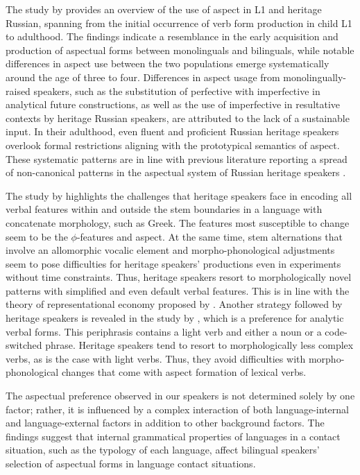\documentclass[output=paper,colorlinks,citecolor=brown]{langscibook}
\begin{document}
The study by \textcite{gagarina2020first} provides an overview of the use of aspect in L1 and heritage Russian, spanning from the initial occurrence of verb form production in child L1 to adulthood. The findings indicate a resemblance in the early acquisition and production of aspectual forms between monolinguals and bilinguals, while notable differences in aspect use between the two populations emerge systematically around the age of three to four. 
Differences in aspect usage from monolingually-raised speakers, such as the substitution of perfective with imperfective in analytical future constructions, as well as the use of imperfective in resultative contexts by heritage Russian speakers, are attributed to the lack of a sustainable input. In their adulthood, even fluent and proficient Russian heritage speakers overlook formal restrictions aligning with the prototypical semantics of aspect. These systematic patterns are in line with previous literature reporting a spread of non-canonical patterns in the aspectual system of Russian heritage speakers \parencite{polinsky2000composite}.

The study by \textcite{novelforms} highlights the challenges that heritage speakers face in encoding all verbal features within and outside the stem boundaries in a language with concatenate morphology, such as Greek. The features most susceptible to change seem to be the $\phi$-features and aspect. At the same time, stem alternations that involve an allomorphic vocalic element and morpho-phonological adjustments seem to pose difficulties for heritage speakers' productions even in experiments without time constraints. Thus, heritage speakers resort to morphologically novel patterns with simplified and even default verbal features. This is in line with the theory of representational economy proposed by \textcite{scontras2015heritage}. Another strategy followed by heritage speakers is revealed in the study by \textcite{alexiadou2022use}, which is a preference for analytic verbal forms. This periphrasis contains a light verb and either a noun or a code-switched phrase. Heritage speakers tend to resort to morphologically less complex verbs, as is the case with light verbs. Thus, they avoid difficulties with morpho-phonological changes that come with aspect formation of lexical verbs.

The aspectual preference observed in our speakers is not determined solely by one factor; rather, it is influenced by a complex interaction of both language-internal and language-external factors in addition to other background factors. The findings suggest that internal grammatical properties of languages in a contact situation, such as the typology of each language, affect bilingual speakers' selection of aspectual forms in language contact situations.
\end{document}
